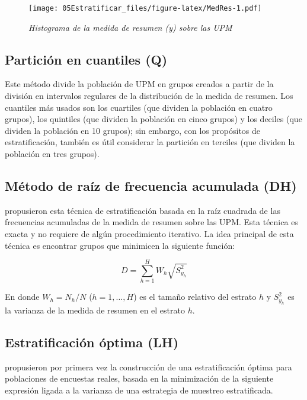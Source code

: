 \documentclass[
  12pt,
  spanish,
]{book}
\begin{document}
\begin{figure}
\centering
\texttt{[image: 05Estratificar\_files/figure-latex/MedRes-1.pdf]}
\caption{\label{fig:MedRes}\emph{Histograma de la medida de resumen (y) sobre las UPM}}
\end{figure}

\hypertarget{particiuxf3n-en-cuantiles-q}{%
\subsection{Partición en cuantiles (Q)}\label{particiuxf3n-en-cuantiles-q}}

Este método divide la población de UPM en grupos creados a partir de la división en intervalos regulares de la distribución de la medida de resumen. Los cuantiles más usados son los cuartiles (que dividen la población en cuatro grupos), los quintiles (que dividen la población en cinco grupos) y los deciles (que dividen la población en 10 grupos); sin embargo, con los propósitos de estratificación, también es útil considerar la partición en terciles (que dividen la población en tres grupos).

\hypertarget{muxe9todo-de-rauxedz-de-frecuencia-acumulada-dh}{%
\subsection{Método de raíz de frecuencia acumulada (DH)}\label{muxe9todo-de-rauxedz-de-frecuencia-acumulada-dh}}

\citet{Dalenius_Hodges_1959} propusieron esta técnica de estratificación basada en la raíz cuadrada de las frecuencias acumuladas de la medida de resumen sobre las UPM. Esta técnica es exacta y no requiere de algún procedimiento iterativo. La idea principal de esta técnica es encontrar grupos que minimicen la siguiente función:

\[
D = \sum_{h=1}^H W_h \sqrt{S^2_{y_{h}}}
\]

En donde \(W_h = N_h/N\) (\(h = 1, \ldots, H\)) es el tamaño relativo del estrato \(h\) y \(S^2_{y_{h}}\) es la varianza de la medida de resumen en el estrato \(h\).

\hypertarget{estratificaciuxf3n-uxf3ptima-lh}{%
\subsection{Estratificación óptima (LH)}\label{estratificaciuxf3n-uxf3ptima-lh}}

\citet{Lavallee_Hidiroglou_1988} propusieron por primera vez la construcción de una estratificación óptima para poblaciones de encuestas reales, basada en la minimización de la siguiente expresión ligada a la varianza de una estrategia de muestreo estratificada.
\end{document}
